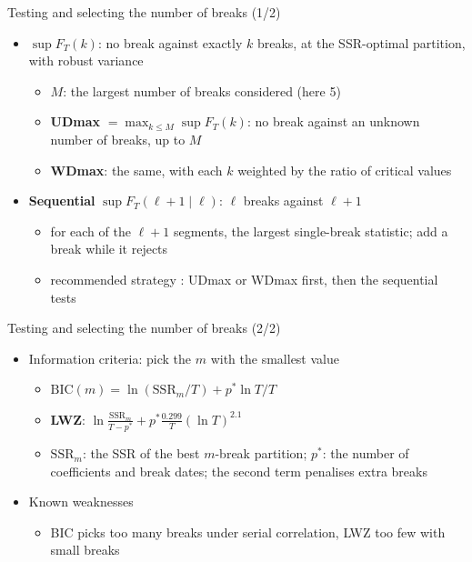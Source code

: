 \begin{frame}{Testing and selecting the number of breaks (1/2)}
\itemsize{\small}
\begin{itemize}
    \item $\sup F_T(k)$: no break against exactly $k$ breaks, at the SSR-optimal partition, with robust variance 
    \begin{itemize}
        \item $M$: the largest number of breaks considered (here 5)
        \item \textbf{UDmax} $= \max_{k \le M}\sup F_T(k)$: no break against an unknown number of breaks, up to $M$
        \item \textbf{WDmax}: the same, with each $k$ weighted by the ratio of critical values
    \end{itemize}
    \item \textbf{Sequential} $\sup F_T(\ell + 1 \mid \ell)$: $\ell$ breaks against $\ell + 1$
    \begin{itemize}
        \item for each of the $\ell + 1$ segments, the largest single-break statistic; add a break while it rejects
        \item recommended strategy : UDmax or WDmax first, then the sequential tests
    \end{itemize}
\end{itemize}
\end{frame}

\begin{frame}{Testing and selecting the number of breaks (2/2)}
\itemsize{\small}
\begin{itemize}
    \item Information criteria: pick the $m$ with the smallest value
    \begin{itemize}
        \item $\mathrm{BIC}(m) = \ln(\mathrm{SSR}_m/T) + p^*\ln T/T$
        \item \textbf{LWZ}: $\ln\frac{\mathrm{SSR}_m}{T - p^*} + p^*\frac{0.299}{T}(\ln T)^{2.1}$ 
        \item $\mathrm{SSR}_m$: the SSR of the best $m$-break partition; $p^*$: the number of coefficients and break dates; the second term penalises extra breaks
    \end{itemize}
    \item Known weaknesses
    \begin{itemize}
        \item BIC picks too many breaks under serial correlation, LWZ too few with small breaks
    \end{itemize}
\end{itemize}
\end{frame}

